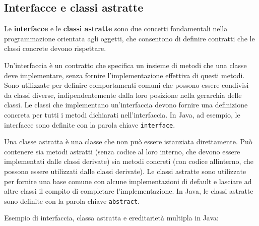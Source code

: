 \documentclass[
  letterpaper,
]{scrbook}
\begin{document}
\subsection{Interfacce e classi
astratte}\label{interfacce-e-classi-astratte}

Le \textbf{interfacce} e le \textbf{classi astratte} sono due concetti
fondamentali nella programmazione orientata agli oggetti, che consentono
di definire contratti che le classi concrete devono rispettare.

Un'interfaccia è un contratto che specifica un insieme di metodi che una
classe deve implementare, senza fornire l'implementazione effettiva di
questi metodi. Sono utilizzate per definire comportamenti comuni che
possono essere condivisi da classi diverse, indipendentemente dalla loro
posizione nella gerarchia delle classi. Le classi che implementano
un'interfaccia devono fornire una definizione concreta per tutti i
metodi dichiarati nell'interfaccia. In Java, ad esempio, le interfacce
sono definite con la parola chiave \texttt{interface}.

Una classe astratta è una classe che non può essere istanziata
direttamente. Può contenere sia metodi astratti (senza codice al loro
interno, che devono essere implementati dalle classi derivate) sia
metodi concreti (con codice allinterno, che possono essere utilizzati
dalle classi derivate). Le classi astratte sono utilizzate per fornire
una base comune con alcune implementazioni di default e lasciare ad
altre classi il compito di completare l'implementazione. In Java, le
classi astratte sono definite con la parola chiave \texttt{abstract}.

Esempio di interfaccia, classa astratta e ereditarietà multipla in Java:
\end{document}
